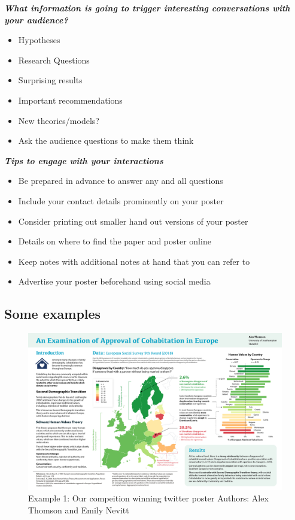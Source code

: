 \documentclass[
]{book}
\providecommand{\tightlist}{%
  \setlength{\itemsep}{0pt}\setlength{\parskip}{0pt}}
\begin{document}
\textbf{\emph{What information is going to trigger interesting conversations with your audience?}}

\begin{itemize}
\tightlist
\item
  Hypotheses
\item
  Research Questions
\item
  Surprising results
\item
  Important recommendations
\item
  New theories/models?
\item
  Ask the audience questions to make them think
\end{itemize}

\textbf{\emph{Tips to engage with your interactions}}

\begin{itemize}
\tightlist
\item
  Be prepared in advance to answer any and all questions
\item
  Include your contact details prominently on your poster
\item
  Consider printing out smaller hand out versions of your poster
\item
  Details on where to find the paper and poster online
\item
  Keep notes with additional notes at hand that you can refer to
\item
  Advertise your poster beforehand using social media
\end{itemize}

\hypertarget{some-examples}{%
\subsection{Some examples}\label{some-examples}}

\begin{figure}
\centering
\includegraphics{img/YISA Poster 2020.png}
\caption{Example 1: Our compeition winning twitter poster Authors: Alex Thomson and Emily Nevitt}
\end{figure}
\end{document}
